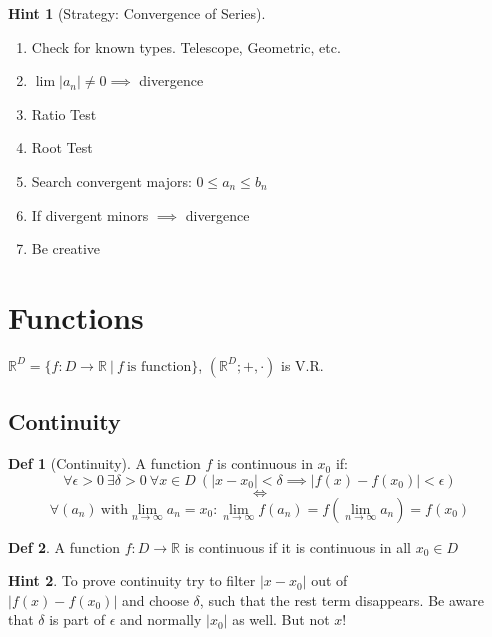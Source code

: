 \documentclass[a4paper, 10pt]{article}
\theoremstyle{definition}
\newtheorem*{definition}{Def}
\newtheorem*{note_wrapper}{Hint}
\theoremstyle{ex}
\theoremstyle{named}
\newenvironment{note}%
    {\begin{mdframed}[style=trick]\begin{note_wrapper}}%
    {\end{note_wrapper}\end{mdframed}}
\newcommand{\R}{\mathbb{R}}
\begin{document}
\begin{note}[Strategy: Convergence of Series]
    $\,$
    \begin{enumerate}
        \item Check for known types. Telescope, Geometric, etc.
        \item $\lim |a_n| \neq 0 \implies$ divergence
        \item Ratio Test
        \item Root Test
        \item Search convergent majors: $0 \leq a_n \leq b_n$
        \item If divergent minors $\implies$ divergence
        \item Be creative
    \end{enumerate}
\end{note}

\section{Functions}
$\R^D = \{f: D \to \R \ | \ f \ \text{is function} \}$, $(\R^D; +, \cdot)$ is V.R.
\subsection{Continuity}
\begin{definition}[Continuity]
    A function $f$ is continuous in $x_0$ if:
    $$\forall \epsilon > 0 \ \exists \delta > 0 \ \forall x \in D \ (|x - x_0| < \delta \implies |f(x) - f(x_0)| < \epsilon)$$
    $$\iff$$
    $$\forall (a_n) \ \text{with}  \lim\limits_{n\to\infty} a_n = x_0 : \lim\limits_{n\to\infty} f(a_n) = f(\lim\limits_{n\to\infty} a_n) = f(x_0)$$
\end{definition}

\begin{definition}
    A function $f: D \to \R$ is continuous if it is continuous in all $x_0 \in D$
\end{definition}

\begin{note}
    To prove continuity try to filter $|x - x_0|$ out of \\
    $|f(x) - f(x_0)|$ and choose $\delta$, such that the rest term disappears. Be aware that $\delta$ is part of $\epsilon$ and normally $|x_0|$ as well. But not $x$!
\end{note}
\end{document}
